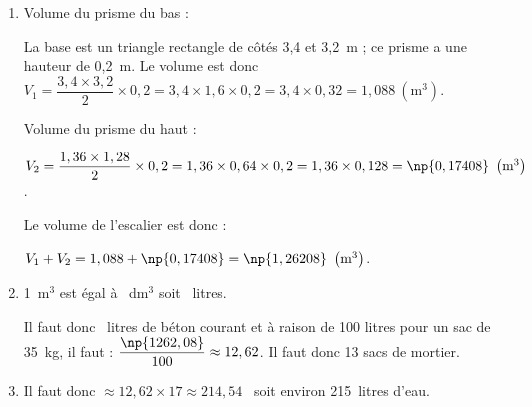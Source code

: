 \begin{enumerate}
\item %
Volume du prisme du bas :

La base est un triangle rectangle de côtés 3,4 et 3,2~m ; ce prisme a une hauteur de 0,2~m. Le volume est donc $V_1 = \dfrac{3,4 \times 3,2}{2} \times 0,2 = 3,4 \times 1,6 \times 0,2 = 3,4\times 0,32 = 1,088~\left(\text{m}^3\right)$.

Volume du prisme du haut :

$V_2 = \dfrac{1,36 \times 1,28}{2} \times 0,2 = 1,36 \times 0,64 \times 0,2 = 1,36 \times 0,128 = \np{0,17408}~\left(\text{m}^3\right)$.

Le volume de l'escalier est donc :

$V_1 + V_2 = 1,088 + \np{0,17408} = \np{1,26208}~\left(\text{m}^3\right)$.
\item %
1~m$^3$ est égal à ~dm$^3$ soit ~litres.

Il faut donc ~litres de béton courant et à raison de 100 litres pour un sac de 35~kg, il faut : $\dfrac{\np{1262,08}}{100} \approx 12,62$. Il faut donc 13 sacs de mortier.
\item %
Il faut donc $\approx 12,62 \times 17 \approx 214,54$~ soit environ 215~litres d'eau.
\end{enumerate}
